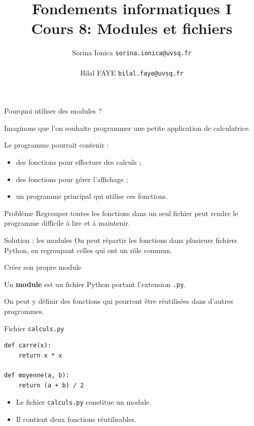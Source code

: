 \documentclass[10pt]{beamer}
\title[IN100 Cours 8]{\textbf{Fondements informatiques I}\\
Cours 8: Modules et fichiers}
\author[]{Sorina Ionica \texttt{sorina.ionica@uvsq.fr} \\~\\Bilal FAYE  \texttt{bilal.faye@uvsq.fr} }
\institute{}
\date{}
\begin{document}
\frame{\titlepage}

\begin{frame}{Pourquoi utiliser des modules ?}

Imaginons que l'on souhaite programmer une petite
application de calculatrice.

Le programme pourrait contenir :
\begin{itemize}
    \item des fonctions pour effectuer des calculs ;
    \item des fonctions pour gérer l'affichage ;
    \item un programme principal qui utilise ces fonctions.
\end{itemize}

\begin{alertblock}{Problème}
\small
Regrouper toutes les fonctions dans un seul fichier peut rendre
le programme difficile à lire et à maintenir.
\end{alertblock}

\begin{block}{Solution : les modules}
\small
On peut répartir les fonctions dans plusieurs fichiers Python,
en regroupant celles qui ont un rôle commun.
\end{block}

\end{frame}
\begin{frame}[fragile]{Créer son propre module}

Un \textbf{module} est un fichier Python portant l'extension
\texttt{.py}.

On peut y définir des fonctions qui pourront être réutilisées
dans d'autres programmes.

\begin{exampleblock}{Fichier \texttt{calculs.py}}
\small
\begin{lstlisting}
def carre(x):
    return x * x

def moyenne(a, b):
    return (a + b) / 2
\end{lstlisting}
\end{exampleblock}

\begin{itemize}
    \item Le fichier \texttt{calculs.py} constitue un module.
    \item Il contient deux fonctions réutilisables.
\end{itemize}

\end{frame}
\end{document}
